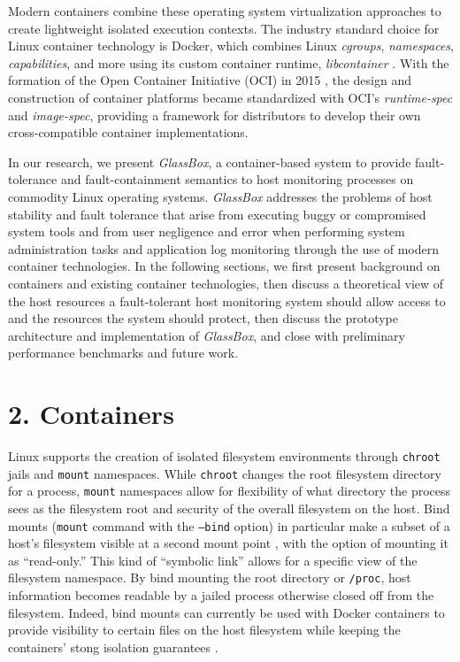 \documentclass{proc}
\begin{document}
Modern containers combine these operating system virtualization approaches to create lightweight isolated execution contexts. The industry standard choice for Linux container technology is Docker, which combines Linux \textit{cgroups}, \textit{namespaces}, \textit{capabilities}, and more using its custom container runtime, \textit{libcontainer} \cite{hykes2014libcontainer}. With the formation of the Open Container Initiative (OCI) in 2015 \cite{opencontainerinitiative}, the design and construction of container platforms became standardized with OCI's \textit{runtime-spec} and \textit{image-spec}, providing a framework for distributors to develop their own cross-compatible container implementations.

In our research, we present \textit{GlassBox}, a container-based system to provide fault-tolerance and fault-containment semantics to host monitoring processes on commodity Linux operating systems. \textit{GlassBox} addresses the problems of host stability and fault tolerance that arise from executing buggy or compromised system tools and from user negligence and error when performing system administration tasks and application log monitoring through the use of modern container technologies. In the following sections, we first present background on containers and existing container technologies, then discuss a theoretical view of the host resources a fault-tolerant host monitoring system should allow access to and the resources the system should protect, then discuss the prototype architecture and implementation of \textit{GlassBox}, and close with preliminary performance benchmarks and future work.

\section*{2. Containers}

Linux supports the creation of isolated filesystem environments through \texttt{chroot} jails and \texttt{mount} namespaces. While \texttt{chroot} changes the root filesystem directory for a process, \texttt{mount} namespaces allow for flexibility of what directory the process sees as the filesystem root and security of the overall filesystem on the host. Bind mounts (\texttt{mount} command with the \texttt{--bind} option) in particular make a subset of a host's filesystem visible at a second mount point \cite{bindmount}, with the option of mounting it as ``read-only.'' This kind of ``symbolic link'' allows for a specific view of the filesystem namespace. By bind mounting the root directory or \texttt{/proc}, host information becomes readable by a jailed process otherwise closed off from the filesystem. Indeed, bind mounts can currently be used with Docker containers to provide visibility to certain files on the host filesystem while keeping the containers' stong isolation guarantees \cite{dockerdoc}.
\end{document}
